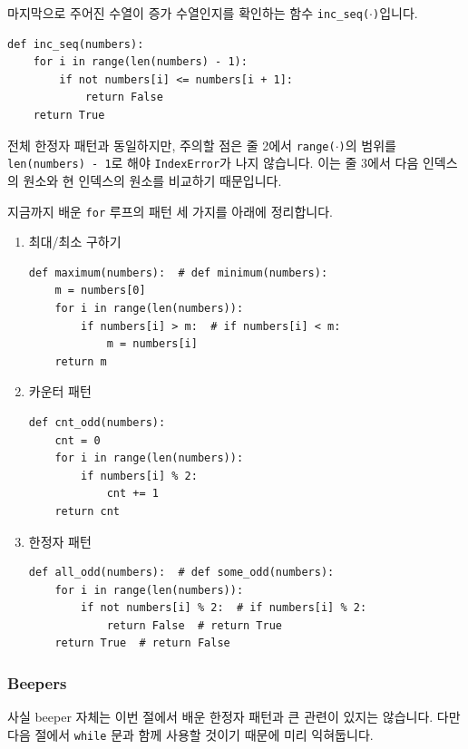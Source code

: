 \documentclass[../main.tex]{subfiles}
\begin{document}
마지막으로 주어진 수열이 증가 수열인지를 확인하는 함수 \texttt{inc\_seq($\cdot$)}입니다.
\begin{verbatim}
def inc_seq(numbers):
    for i in range(len(numbers) - 1):
        if not numbers[i] <= numbers[i + 1]:
            return False
    return True
\end{verbatim}
전체 한정자 패턴과 동일하지만, 주의할 점은 줄 2에서 \texttt{range($\cdot$)}의 범위를 \texttt{len(numbers) - 1}로 해야 \texttt{IndexError}가 나지 않습니다.
이는 줄 3에서 다음 인덱스의 원소와 현 인덱스의 원소를 비교하기 때문입니다.

지금까지 배운 \texttt{for} 루프의 패턴 세 가지를 아래에 정리합니다.
\begin{enumerate}
\item 최대/최소 구하기
\begin{verbatim}
def maximum(numbers):  # def minimum(numbers):
    m = numbers[0]
    for i in range(len(numbers)):
        if numbers[i] > m:  # if numbers[i] < m:
            m = numbers[i]
    return m
\end{verbatim}
\item 카운터 패턴
\begin{verbatim}
def cnt_odd(numbers):
    cnt = 0
    for i in range(len(numbers)):
        if numbers[i] % 2:
            cnt += 1
    return cnt
\end{verbatim}
\item 한정자 패턴
\begin{verbatim}
def all_odd(numbers):  # def some_odd(numbers):
    for i in range(len(numbers)):
        if not numbers[i] % 2:  # if numbers[i] % 2:
            return False  # return True
    return True  # return False
\end{verbatim}
\end{enumerate}

\subsubsection{Beepers}
사실 beeper 자체는 이번 절에서 배운 한정자 패턴과 큰 관련이 있지는 않습니다.
다만 다음 절에서 \texttt{while} 문과 함께 사용할 것이기 때문에 미리 익혀둡니다.
\end{document}
